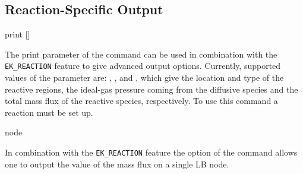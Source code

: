 \subsection{\label{ssec:ek-reac-output}Reaction-Specific Output}

\begin{essyntax}
  print 
   []
  \begin{features}
  \end{features}
\end{essyntax}
The print parameter of the  command can be used in
combination with the \texttt{EK\_REACTION} feature to give advanced output 
options. Currently, supported values of the parameter  are: 
, , and , which give the 
location and type of the reactive regions, the ideal-gas pressure coming from 
the diffusive species and the total mass flux of the reactive species,
respectively. To use this command a reaction must be set up.

\begin{essyntax}
  node    
  \begin{features}
  \end{features}
\end{essyntax}
In combination with the \texttt{EK\_REACTION} feature the  option of 
the  command allows one to output the value of the mass 
flux on a single LB node.

